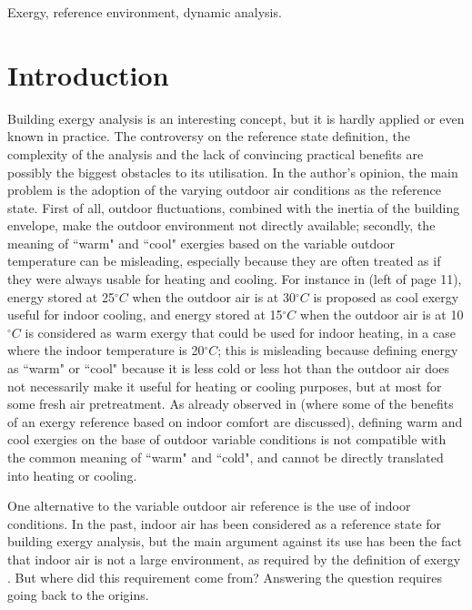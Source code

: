 \documentclass[10pt]{extarticle} %
\begin{document}
{\sffamily\normalsize Exergy, reference environment, dynamic analysis.}


\section{Introduction} 

\sffamily\normalsize

Building exergy analysis is an interesting concept, but it is hardly applied or even known in practice. The controversy on the reference state definition, the complexity of the analysis and the lack of convincing practical benefits are possibly the biggest obstacles to its utilisation. In the author's opinion, the main problem is the adoption of the varying outdoor air conditions as the reference state. First of all, outdoor fluctuations, combined with the inertia of the building envelope, make the outdoor environment not directly available; secondly, the meaning of ``warm" and ``cool" exergies based on the variable outdoor temperature can be misleading, especially because they are often treated as if they were always usable for heating and cooling. For instance in \cite{Choi2020} (left of page 11), energy stored at 25$^\circ C$ when the outdoor air is at 30$^\circ C$ is proposed as cool exergy useful for indoor cooling, and energy stored at 15$^\circ C$ when the outdoor air is at 10$^\circ C$ is considered as warm exergy that could be used for indoor heating, in a case where the indoor temperature is 20$^\circ C$; this is misleading because defining energy as ``warm" or ``cool" because it is less cold or less hot than the outdoor air does not necessarily make it useful for heating or cooling purposes, but at most for some fresh air pretreatment. As already observed in \cite{Bonetti2017a} (where some of the benefits of an exergy reference based on indoor comfort are discussed), defining warm and cool exergies on the base of outdoor variable conditions is not compatible with the common meaning of ``warm" and ``cold", and cannot be directly translated into heating or cooling.

One alternative to the variable outdoor air reference is the use of indoor conditions. In the past, indoor air has been considered as a reference state for building exergy analysis, but the main argument against its use has been the fact that indoor air is not a large environment, as required by the definition of exergy \citep{Schmidt2011}. But where did this requirement come from? Answering the question requires going back to the origins.
\end{document}
